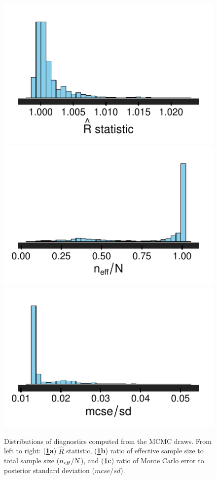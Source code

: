 \begin{figure}[h]
\centering
	\includegraphics[scale=0.7]{sections/figs/rhat}
	\includegraphics[scale=0.7]{sections/figs/neff}
	\includegraphics[scale=0.7]{sections/figs/mcse}
\caption{Distributions of diagnostics computed from the MCMC draws. From left to right: ({\bf\ref{fig:ck_diagnostics}a}) $\hat{R}$ statistic,  ({\bf\ref{fig:ck_diagnostics}b}) ratio of effective sample size to total sample size ($n_{\it eff}/N$), and ({\bf\ref{fig:ck_diagnostics}c}) ratio of Monte Carlo error to posterior standard deviation ($mcse/sd$).}
\label{fig:ck_diagnostics}
\end{figure}

